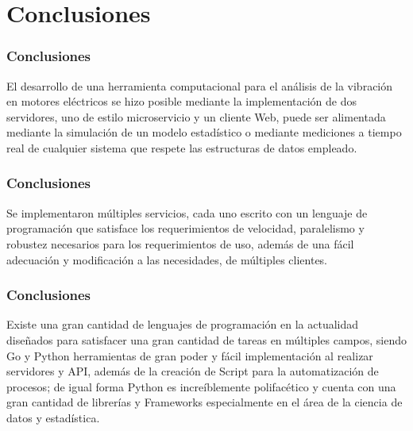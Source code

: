 \documentclass{beamer}
\begin{document}
\begin{frame}
\begin{table}
    \end{table}
\end{frame}

\section{Conclusiones}
\begin{frame}
    \frametitle{Conclusiones}
     El desarrollo  de una herramienta computacional para el análisis de
    la vibración en motores eléctricos se hizo posible mediante la
    implementación de dos servidores, uno de estilo
    microservicio y un cliente Web, puede ser alimentada mediante la
    simulación de un  modelo estadístico o
    mediante mediciones a tiempo real de cualquier sistema
    que respete las estructuras de datos empleado.
\end{frame}

\begin{frame}
    \frametitle{Conclusiones}
    Se implementaron múltiples servicios, cada uno escrito con un
    lenguaje de programación que satisface los requerimientos de velocidad,
    paralelismo y robustez necesarios para  los requerimientos de
    uso, además de una fácil adecuación y modificación a las necesidades,
    de múltiples clientes.
\end{frame}

\begin{frame}
    \frametitle{Conclusiones}
    Existe una gran cantidad de lenguajes de programación en la actualidad
    diseñados para satisfacer una gran cantidad de tareas en múltiples campos,
    siendo Go y Python herramientas de gran poder y fácil implementación
    al realizar servidores y API, además de la creación de Script
    para la automatización de procesos; de igual forma Python es increíblemente
    polifacético y cuenta con una gran cantidad de librerías y Frameworks
    especialmente en el área de la ciencia de datos y estadística.
\end{frame}
\end{document}
